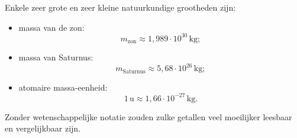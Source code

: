 \documentclass{ximera}
\begin{document}
\begin{voorbeeld}

Enkele zeer grote en zeer kleine natuurkundige grootheden zijn:

\begin{itemize}

    \item massa van de zon:
    \[
    m_{\text{zon}}
    \approx
    1{,}989 \cdot 10^{30}\,\si{\kilogram};
    \]

    \item massa van Saturnus:
    \[
    m_{\text{Saturnus}}
    \approx
    5{,}68 \cdot 10^{26}\,\si{\kilogram};
    \]

    \item atomaire massa-eenheid:
    \[
    1\,\mathrm{u}
    \approx
    1{,}66 \cdot 10^{-27}\,\si{\kilogram}.
    \]

\end{itemize}

Zonder wetenschappelijke notatie zouden zulke getallen veel moeilijker
leesbaar en vergelijkbaar zijn.

\end{voorbeeld}


\end{document}
